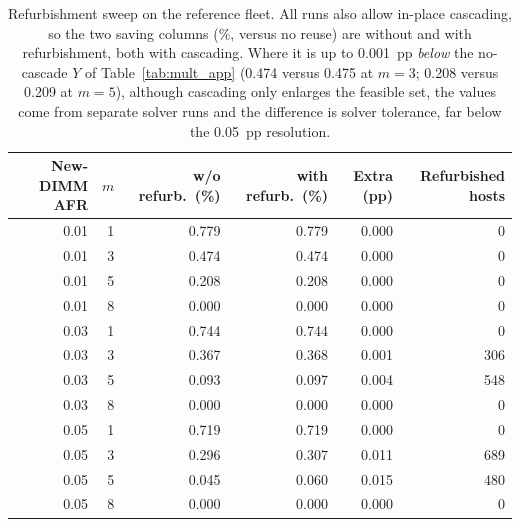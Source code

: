 \documentclass{article} %
\begin{document}
\begin{table}[h]
\caption{Refurbishment sweep on the reference fleet. All runs also allow in-place cascading, so the two saving columns (\%, versus no reuse) are without and with refurbishment, both with cascading. Where it is up to 0.001~pp \emph{below} the no-cascade $Y$ of Table~\ref{tab:mult_app} (0.474 versus 0.475 at $m=3$; 0.208 versus 0.209 at $m=5$), although cascading only enlarges the feasible set, the values come from separate solver runs and the difference is solver tolerance, far below the 0.05~pp resolution.}
\label{tab:refurb}
\begin{center}
\small
\begin{tabular}{rrrrrr}
\toprule
New-DIMM AFR & $m$ & w/o refurb.\ (\%) & with refurb.\ (\%) & Extra (pp) & Refurbished hosts \\
\midrule
0.01 & 1 & 0.779 & 0.779 & 0.000 & 0 \\
0.01 & 3 & 0.474 & 0.474 & 0.000 & 0 \\
0.01 & 5 & 0.208 & 0.208 & 0.000 & 0 \\
0.01 & 8 & 0.000 & 0.000 & 0.000 & 0 \\
0.03 & 1 & 0.744 & 0.744 & 0.000 & 0 \\
0.03 & 3 & 0.367 & 0.368 & 0.001 & 306 \\
0.03 & 5 & 0.093 & 0.097 & 0.004 & 548 \\
0.03 & 8 & 0.000 & 0.000 & 0.000 & 0 \\
0.05 & 1 & 0.719 & 0.719 & 0.000 & 0 \\
0.05 & 3 & 0.296 & 0.307 & 0.011 & 689 \\
0.05 & 5 & 0.045 & 0.060 & 0.015 & 480 \\
0.05 & 8 & 0.000 & 0.000 & 0.000 & 0 \\
\bottomrule
\end{tabular}
\end{center}
\end{table}
\end{document}
